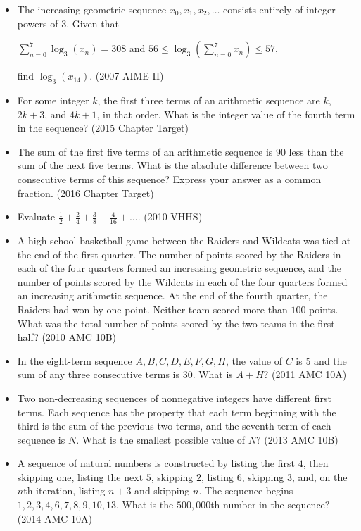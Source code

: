 \documentclass{article}
\begin{document}
\begin{itemize}
\item The increasing geometric sequence $x_{0},x_{1},x_{2},\ldots$ consists entirely of integer powers of $3.$ Given that

$\sum_{n=0}^{7}\log_{3}(x_{n}) = 308$ and $56 \leq \log_{3}\left ( \sum_{n=0}^{7}x_{n}\right ) \leq 57,$

find $\log_{3}(x_{14}).$ (2007 AIME II)

\item For some integer $k$, the first three terms of an arithmetic sequence are $k$, $2k+3$, and $4k+1$, in that order. What is the integer value of the fourth term in the sequence? (2015 Chapter Target)

\item The sum of the first five terms of an arithmetic sequence is 90 less than the sum of the next five terms. What is the absolute difference between two consecutive terms of this sequence? Express your answer as a common fraction. (2016 Chapter Target)

%
\item Evaluate $\frac{1}{2}+\frac{2}{4}+\frac{3}{8}+\frac{4}{16}+\ldots$. (2010 VHHS)

\item A high school basketball game between the Raiders and Wildcats was tied at the end of the first quarter. The number of points scored by the Raiders in each of the four quarters formed an increasing geometric sequence, and the number of points scored by the Wildcats in each of the four quarters formed an increasing arithmetic sequence. At the end of the fourth quarter, the Raiders had won by one point. Neither team scored more than $100$ points. What was the total number of points scored by the two teams in the first half? (2010 AMC 10B)

\item In the eight-term sequence $A,B,C,D,E,F,G,H$, the value of $C$ is 5 and the sum of any three consecutive terms is 30.  What is $A+H$? (2011 AMC 10A)

\item Two non-decreasing sequences of nonnegative integers have different first terms. Each sequence has the property that each term beginning with the third is the sum of the previous two terms, and the seventh term of each sequence is $N$. What is the smallest possible value of $N$? (2013 AMC 10B)

\item A sequence of natural numbers is constructed by listing the first $4$, then skipping one, listing the next $5$, skipping $2$, listing $6$, skipping $3$, and, on the $n$th iteration, listing $n+3$ and skipping $n$. The sequence begins $1,2,3,4,6,7,8,9,10,13$. What is the $500,000$th number in the sequence? (2014 AMC 10A)


\end{itemize}
\end{document}
